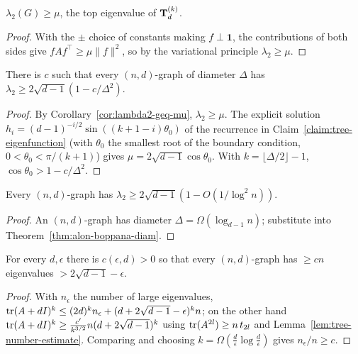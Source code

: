 \begin{corollary}[5.7, $\lambda_2\ge\mu$]
  \label{cor:lambda2-geq-mu}
  $\lambda_2(G)\ge\mu$, the top eigenvalue of $\mathbf{T}_d^{(k)}$.
\end{corollary}
\begin{proof}
  With the $\pm$ choice of constants making $f\perp\mathbf 1$, the contributions
  of both sides give $fAf^\top\ge\mu\|f\|^2$, so by the variational principle
  $\lambda_2\ge\mu$.
\end{proof}

\begin{theorem}
  \label{thm:alon-boppana-diam}
  There is $c$ such that every $(n,d)$-graph of diameter $\Delta$ has
  $\lambda_2\ge2\sqrt{d-1}(1-c/\Delta^2)$.
\end{theorem}
\begin{proof}
  By Corollary~\ref{cor:lambda2-geq-mu}, $\lambda_2\ge\mu$. The explicit solution
  $h_i=(d-1)^{-i/2}\sin((k+1-i)\theta_0)$ of the recurrence in
  Claim~\ref{claim:tree-eigenfunction} (with $\theta_0$ the smallest root of the
  boundary condition, $0<\theta_0<\pi/(k+1)$) gives $\mu=2\sqrt{d-1}\cos\theta_0$.
  With $k=\lfloor\Delta/2\rfloor-1$, $\cos\theta_0>1-c/\Delta^2$.
\end{proof}

\begin{corollary}
  \label{cor:alon-boppana-log}
  Every $(n,d)$-graph has $\lambda_2\ge2\sqrt{d-1}(1-O(1/\log^2n))$.
\end{corollary}
\begin{proof}
  An $(n,d)$-graph has diameter $\Delta=\Omega(\log_{d-1}n)$; substitute into
  Theorem~\ref{thm:alon-boppana-diam}.
\end{proof}

\begin{theorem}
  \label{thm:serre}
  For every $d,\epsilon$ there is $c(\epsilon,d)>0$ so that every $(n,d)$-graph
  has $\ge cn$ eigenvalues $>2\sqrt{d-1}-\epsilon$.
\end{theorem}
\begin{proof}
  With $n_\epsilon$ the number of large eigenvalues,
  $\operatorname{tr}(A+dI)^k\le(2d)^kn_\epsilon+(d+2\sqrt{d-1}-\epsilon)^kn$; on the other hand
  $\operatorname{tr}(A+dI)^k\ge\tfrac{c'}{k^{3/2}}n(d+2\sqrt{d-1})^k$ using
  $\operatorname{tr}(A^{2l})\ge n\,t_{2l}$ and Lemma~\ref{lem:tree-number-estimate}. Comparing
  and choosing $k=\Omega(\tfrac d\epsilon\log\tfrac d\epsilon)$ gives
  $n_\epsilon/n\ge c$.
\end{proof}

